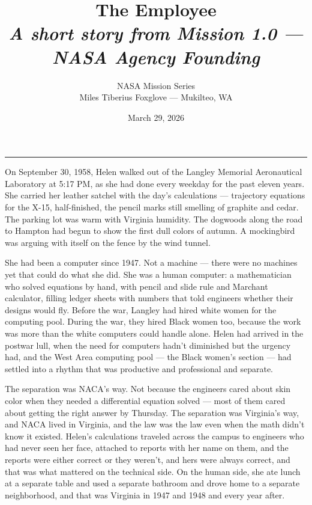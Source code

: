 \documentclass[12pt, letterpaper]{article}
\title{\Huge\textbf{The Employee}\\[0.5em]\large\textit{A short story from Mission 1.0 --- NASA Agency Founding}}
\author{NASA Mission Series\\[0.3em]\small Miles Tiberius Foxglove --- Mukilteo, WA}
\date{March 29, 2026}
\begin{document}
\maketitle
\thispagestyle{empty}

\vspace{1em}
\noindent\rule{\textwidth}{0.4pt}
\vspace{1em}

\noindent On September 30, 1958, Helen walked out of the Langley Memorial Aeronautical Laboratory at 5:17 PM, as she had done every weekday for the past eleven years. She carried her leather satchel with the day's calculations --- trajectory equations for the X-15, half-finished, the pencil marks still smelling of graphite and cedar. The parking lot was warm with Virginia humidity. The dogwoods along the road to Hampton had begun to show the first dull colors of autumn. A mockingbird was arguing with itself on the fence by the wind tunnel.

She had been a computer since 1947. Not a machine --- there were no machines yet that could do what she did. She was a human computer: a mathematician who solved equations by hand, with pencil and slide rule and Marchant calculator, filling ledger sheets with numbers that told engineers whether their designs would fly. Before the war, Langley had hired white women for the computing pool. During the war, they hired Black women too, because the work was more than the white computers could handle alone. Helen had arrived in the postwar lull, when the need for computers hadn't diminished but the urgency had, and the West Area computing pool --- the Black women's section --- had settled into a rhythm that was productive and professional and separate.

The separation was NACA's way. Not because the engineers cared about skin color when they needed a differential equation solved --- most of them cared about getting the right answer by Thursday. The separation was Virginia's way, and NACA lived in Virginia, and the law was the law even when the math didn't know it existed. Helen's calculations traveled across the campus to engineers who had never seen her face, attached to reports with her name on them, and the reports were either correct or they weren't, and hers were always correct, and that was what mattered on the technical side. On the human side, she ate lunch at a separate table and used a separate bathroom and drove home to a separate neighborhood, and that was Virginia in 1947 and 1948 and every year after.
\end{document}
